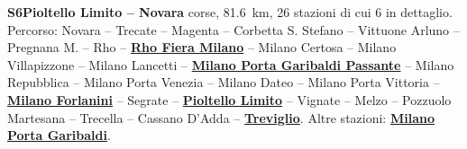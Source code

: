 \medskip\noindent\hypertarget{lin:S6}{\textbf{S6\enspace Pioltello Limito -- Novara}} corse, \SI{81,6}{\km}, 26 stazioni di cui 6 in dettaglio. Percorso: Novara -- Trecate -- Magenta -- Corbetta S. Stefano -- Vittuone Arluno -- Pregnana M. -- Rho -- \hyperlink{sta:S01039}{\textbf{Rho Fiera Milano}} -- Milano Certosa -- Milano Villapizzone -- Milano Lancetti -- \hyperlink{sta:S01647}{\textbf{Milano Porta Garibaldi Passante}} -- Milano Repubblica -- Milano Porta Venezia -- Milano Dateo -- Milano Porta Vittoria -- \hyperlink{sta:S01492}{\textbf{Milano Forlanini}} -- Segrate -- \hyperlink{sta:S01703}{\textbf{Pioltello Limito}} -- Vignate -- Melzo -- Pozzuolo Martesana -- Trecella -- Cassano D'Adda -- \hyperlink{sta:S01708}{\textbf{Treviglio}}. Altre stazioni: \hyperlink{sta:S01645}{\textbf{Milano Porta Garibaldi}}.

